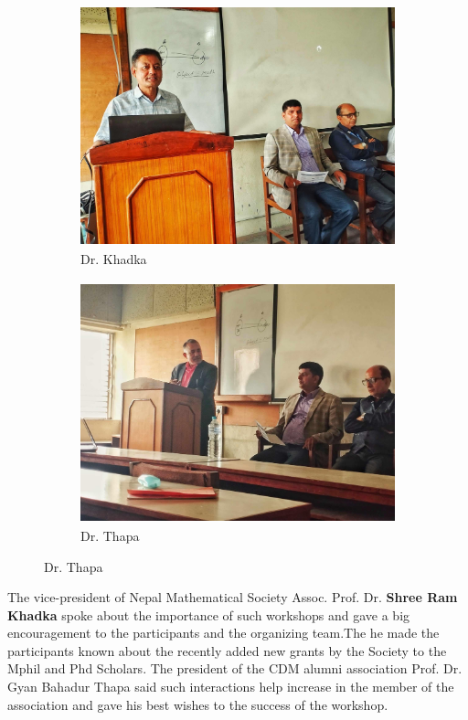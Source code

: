 \message{ !name(latexworkhop_report.tex)}\documentclass[a4paper,12pt]{report}
\begin{document}
\vspace*{5mm}
\begin{figure}[h!]
\centering
\begin{subfigure}{0.45\textwidth}
    \includegraphics[height=7cm, width=\textwidth]{shreeramsir.jpg}
    \caption{Dr. Khadka}
    \label{fig:first}
\end{subfigure}
\hfill
\begin{subfigure}{0.45\textwidth}
    \includegraphics[height=7cm, width=\textwidth]{gyansir.jpg}
    \caption{Dr. Thapa}
    \label{fig:second}
\end{subfigure}
\end{figure}

\noindent
The vice-president of Nepal Mathematical Society Assoc. Prof. Dr. \textbf{Shree Ram Khadka} spoke about the importance of such workshops and gave a big encouragement to the participants and the organizing team.The he made the participants known about the recently added new grants by the Society to the Mphil and Phd Scholars. The president of the CDM alumni association Prof. Dr. {Gyan Bahadur Thapa} said such interactions help increase in the member of the association and gave his best wishes to the success of the workshop.\\[3mm]
\end{document}
